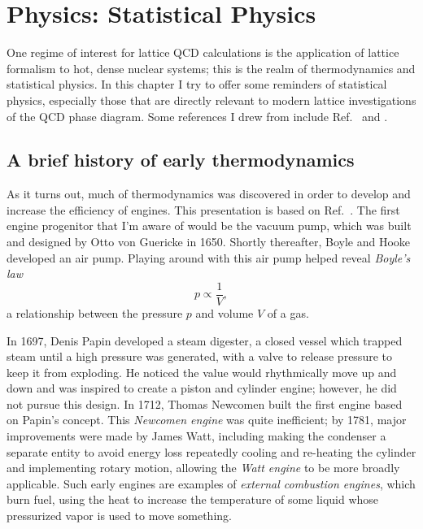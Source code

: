 \chapter{Physics: Statistical Physics}\label{ch:statphys}

One regime of interest for lattice QCD calculations is the application
of lattice formalism to hot, dense nuclear systems; this is the realm
of thermodynamics and statistical physics. In this chapter I try to
offer some reminders of statistical physics, especially those that
are directly relevant to modern lattice investigations of the QCD
phase diagram. Some references I drew from include
Ref.~\cite{tahir-kheli_general_2012} and \cite{kardar_statistical_2007}.

\section{A brief history of early thermodynamics}

As it turns out, much of thermodynamics was discovered in order to develop
and increase the efficiency of engines. This presentation is based
on Ref.~\cite{wiki:thermo}. The first engine progenitor that I'm
aware of would be the vacuum pump, which was built and designed by Otto von 
Guericke in 1650. Shortly thereafter, Boyle and Hooke developed an air pump.
Playing around with this air pump helped reveal {\it Boyle's law}
\begin{equation}
  p\propto\frac{1}{V},
\end{equation}
a relationship between the pressure $p$ and volume $V$ of a gas.

In 1697, Denis Papin developed a steam digester, a closed vessel which trapped steam 
until a high pressure was generated, with a valve to release pressure to keep it
from exploding.  He noticed the value would rhythmically move up and down and was 
inspired to create a piston and cylinder engine; however, he did not pursue this design. 
In 1712, Thomas Newcomen built the first engine based on Papin's concept.
This {\it Newcomen engine} was quite inefficient; by
1781, major improvements were made by James Watt, including making the condenser a separate
entity to avoid energy loss repeatedly cooling and re-heating the cylinder and
implementing rotary motion, allowing the {\it Watt engine} to 
be more broadly applicable.
Such early engines are examples of {\it external combustion engines}, which
burn
fuel, using the heat to increase the temperature of some liquid whose
pressurized vapor is used to move something.

